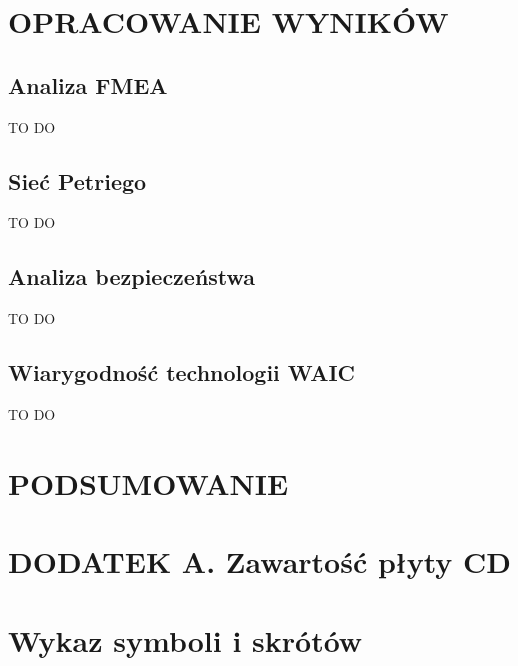 \documentclass[a4paper, 12pt, twoside]{article}
\begin{document}
\section{OPRACOWANIE WYNIKÓW}  \label{wyniki}
\vspace{3.0 cm}

\vspace{1.0 cm}
\subsection{Analiza FMEA}
TO DO

\subsection{Sieć Petriego}
TO DO

\subsection{Analiza bezpieczeństwa}
TO DO

\subsection{Wiarygodność technologii WAIC}
TO DO 

\newpage
\vspace*{1.5 cm}
\section{PODSUMOWANIE}
\vspace{3.0 cm}

\newpage
\section*{DODATEK A. Zawartość płyty CD}
\vspace{3.0 cm}

\newpage
\section*{}
\printbibliography

\newpage
\section*{Wykaz symboli i skrótów}
\end{document}
